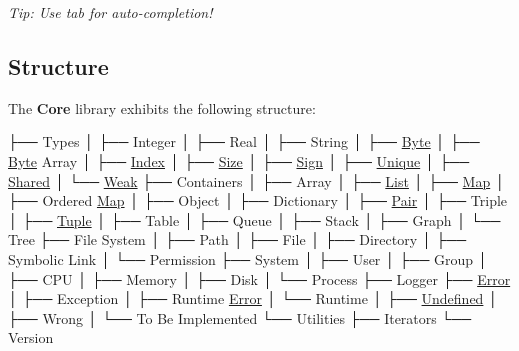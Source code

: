 {\itshape Tip\+: Use tab for auto-\/completion!}

\subsection*{Structure}

The {\bfseries Core} library exhibits the following structure\+:


\begin{DoxyCode}
├── Types
│   ├── Integer
│   ├── Real
│   ├── String
│   ├── \hyperlink{namespaceostk_1_1core_1_1types_a0733eebee5d093ea04df859028e2649f}{Byte}
│   ├── \hyperlink{namespaceostk_1_1core_1_1types_a0733eebee5d093ea04df859028e2649f}{Byte} Array
│   ├── \hyperlink{namespaceostk_1_1core_1_1types_a6e63c1b15b2e5bc87a43771c09fa913a}{Index}
│   ├── \hyperlink{namespaceostk_1_1core_1_1types_acf68f214a245e35a7c1994c84dc56746}{Size}
│   ├── \hyperlink{namespaceostk_1_1core_1_1types_ae10e15cf66b50aaec17f4f78c984d7bf}{Sign}
│   ├── \hyperlink{namespaceostk_1_1core_1_1types_a0ff1c5e84c7c42c929044b1be97ba680}{Unique}
│   ├── \hyperlink{namespaceostk_1_1core_1_1types_a3e7aff47b81452ed1f18f6d8f6c90140}{Shared}
│   └── \hyperlink{namespaceostk_1_1core_1_1types_a0dd80951dd3139e43b5c0b3e5928d08a}{Weak}
├── Containers
│   ├── Array
│   ├── \hyperlink{namespaceostk_1_1core_1_1ctnr_a5802e21d045076175dcb310a7045c858}{List}
│   ├── \hyperlink{namespaceostk_1_1core_1_1ctnr_a2184a633cc52230b0617fab960393bc5}{Map}
│   ├── Ordered \hyperlink{namespaceostk_1_1core_1_1ctnr_a2184a633cc52230b0617fab960393bc5}{Map}
│   ├── Object
│   ├── Dictionary
│   ├── \hyperlink{namespaceostk_1_1core_1_1ctnr_a08e64f04352e3c432bff0cfd3b23923b}{Pair}
│   ├── Triple
│   ├── \hyperlink{namespaceostk_1_1core_1_1ctnr_a7f01ca040222e5b0c02a90aa68cc8e88}{Tuple}
│   ├── Table
│   ├── Queue
│   ├── Stack
│   ├── Graph
│   └── Tree
├── File System
│   ├── Path
│   ├── File
│   ├── Directory
│   ├── Symbolic Link
│   └── Permission
├── System
│   ├── User
│   ├── Group
│   ├── CPU
│   ├── Memory
│   ├── Disk
│   └── Process
├── Logger
├── \hyperlink{namespaceostk_1_1core_1_1logger_a52d02954e094391f067befffe7f3cae9a902b0d55fddef6f8d651fe1035b7d4bd}{Error}
│   ├── Exception
│   ├── Runtime \hyperlink{namespaceostk_1_1core_1_1logger_a52d02954e094391f067befffe7f3cae9a902b0d55fddef6f8d651fe1035b7d4bd}{Error}
│   └── Runtime
│       ├── \hyperlink{namespaceostk_1_1core_1_1types_ae10e15cf66b50aaec17f4f78c984d7bfaec0fc0100c4fc1ce4eea230c3dc10360}{Undefined}
│       ├── Wrong
│       └── To Be Implemented
└── Utilities
    ├── Iterators
    └── Version
\end{DoxyCode}


